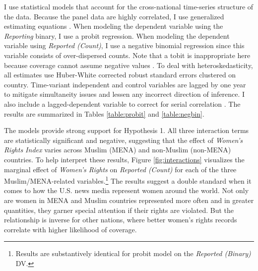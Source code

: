 \documentclass[11pt, oneside]{article}
\begin{document}
I use statistical models that account for the cross-national time-series structure of the data. Because the panel data are highly correlated, I use generalized estimating equations \cite{zorn2001}. When modeling the dependent variable using the \emph{Reporting} binary, I use a probit regression. When modeling the dependent variable using \emph{Reported (Count)}, I use a negative binomial regression since this variable consists of over-dispersed counts. Note that a tobit is inappropriate here because coverage cannot assume negative values \cite{sigelman1999}. To deal with heteroskedasticity, all estimates use Huber-White corrected robust standard errors clustered on country.  Time-variant independent and control variables are lagged by one year to mitigate simultaneity issues and lessen any incorrect direction of inference. I also include a lagged-dependent variable to correct for serial correlation \cite{wooldridge2010}. The results are summarized in Tables \ref{table:probit} and \ref{table:negbin}.

The models provide strong support for Hypothesis 1. All three interaction terms are statistically significant and negative, suggesting that the effect of \emph{Women's Rights Index} varies across Muslim (MENA) and non-Muslim (non-MENA) countries. To help interpret these results, Figure \ref{fig:interactions} visualizes the marginal effect of \emph{Women's Rights} on \emph{Reported (Count)} for each of the three Muslim/MENA-related variables.\footnote{\hspace{5}Results are substantively identical for probit model on the \emph{Reported (Binary)} DV.} The results suggest a double standard when it comes to how the U.S. news media represent women around the world. Not only are women in MENA and Muslim countries represented more often and in greater quantities, they garner special attention if their rights are violated. But the relationship is inverse for other nations, where better women's rights records correlate with higher likelihood of coverage. 



\end{document}
